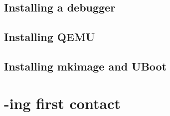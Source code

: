     \subsection{Installing a debugger}

    \subsection{Installing QEMU}

    \subsection{Installing mkimage and UBoot}


    \section{-ing first contact}





